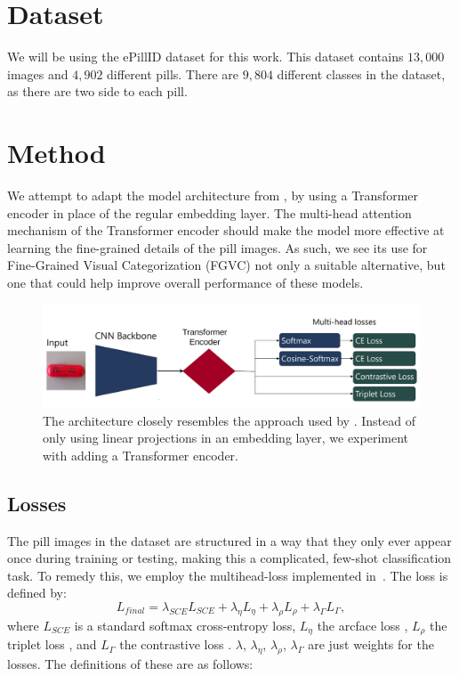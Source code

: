 \documentclass[10pt,twocolumn,letterpaper]{article}
\begin{document}
\section{Dataset}
We will be using the ePillID dataset \cite{ePill} for this work.  This dataset contains $13,000$ images and $4,902$ different pills.  There are $9,804$ different classes in the dataset, as there are two side to each pill.

\section{Method}
We attempt to adapt the model architecture from \cite{ePill}, by using a Transformer encoder in place of the regular embedding layer. The multi-head attention
mechanism of the Transformer encoder should make the model more effective at learning the fine-grained details of the pill images. As such, we see its use for 
Fine-Grained Visual Categorization (FGVC) not only a suitable alternative, but one that could help improve overall performance of these models.

\begin{figure}[h]
    \centering
    \includegraphics[width=.5\textwidth]{encoder.png}
    \caption{The architecture closely resembles the approach used by \cite{repo}. Instead of only using linear projections
    in an embedding layer, we experiment with adding a Transformer encoder.}
    \label{fig:t_head}
\end{figure}

\subsection{Losses}
The pill images in the dataset are structured in a way that they only ever appear once during training or testing, making this a complicated, few-shot classification task. To remedy this, we employ the multihead-loss implemented in~\cite{ePill}.  The loss is defined by:
\begin{equation}
L_{final} = \lambda_{SCE}L_{SCE} + \lambda_\eta L_\eta + \lambda_\rho L_\rho + \lambda_\Gamma L_\Gamma,
\end{equation}
where $L_{SCE}$ is a standard softmax cross-entropy loss, $L_\eta$ the arcface loss \cite{arc}, $L_\rho$ the triplet loss \cite{triplet}, and $L_\Gamma$ the contrastive loss \cite{contrast}. 
$\lambda$, $\lambda_\eta$, $\lambda_\rho$, $\lambda_\Gamma$ are just weights for the losses. The definitions of these are as follows:
\end{document}
